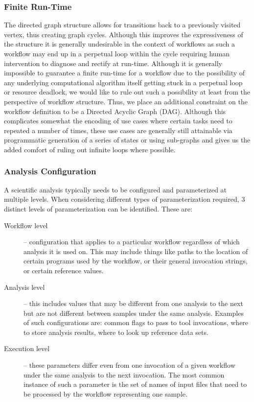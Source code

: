 \subsubsection{Finite Run-Time}
The directed graph structure allows for transitions back to a previously visited vertex, thus creating graph cycles. Although this improves the expressiveness of the structure it is generally undesirable in the context of workflows as such a workflow may end up in a perpetual loop within the cycle requiring human intervention to diagnose and rectify at run-time. Although it is generally impossible to guarantee a finite run-time for a workflow due to the possibility of any underlying computational algorithm itself getting stuck in a perpetual loop or resource deadlock, we would like to rule out such a possibility at least from the perspective of workflow structure. Thus, we place an additional constraint on the workflow definition to be a Directed Acyclic Graph (DAG). Although this complicates somewhat the encoding of use cases where certain tasks need to repeated a number of times, these use cases are generally still attainable via programmatic generation of a series of states or using sub-graphs and gives us the added comfort of ruling out infinite loops where possible.

\subsubsection{Analysis Configuration}
A scientific analysis typically needs to be configured and parameterized at multiple levels. When considering different types of parameterization required, 3 distinct levels of parameterization can be identified. These are:

\begin{description}
\item[Workflow level] -- configuration that applies to a particular workflow regardless of which analysis it is used on. This may include things like paths to the location of certain programs used by the workflow, or their general invocation strings, or certain reference values.
\item[Analysis level] -- this includes values that may be different from one analysis to the next but are not different between samples under the same analysis.  Examples of such configurations are: common flags to pass to tool invocations, where to store analysis results, where to look up reference data sets.
\item[Execution level] -- these parameters differ even from one invocation of a given workflow under the same analysis to the next invocation. The most common instance of such a parameter is the set of names of input files that need to be processed by the workflow representing one sample. 
\end{description}

